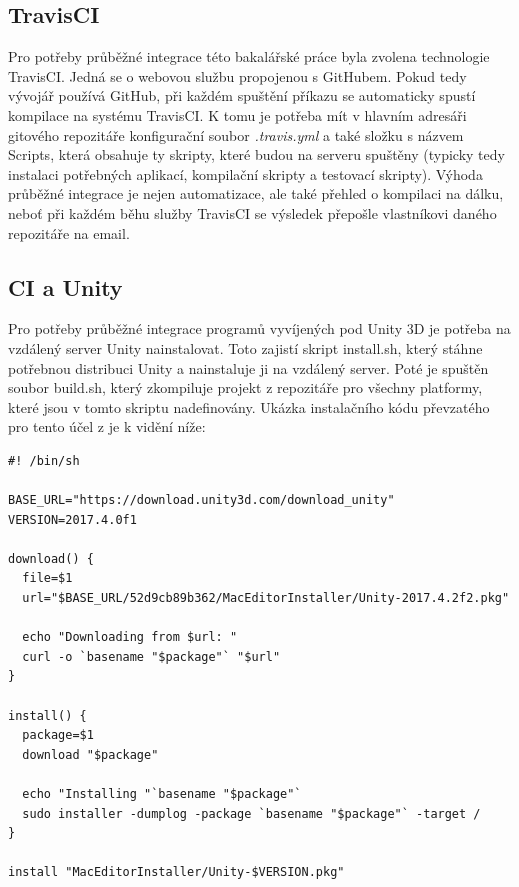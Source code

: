\documentclass[thesis=B,czech]{FITthesis}[2012/06/26]
\begin{document}
	\subsection{TravisCI}
Pro potřeby průběžné integrace této bakalářské práce byla zvolena technologie TravisCI. Jedná se o webovou službu propojenou s GitHubem. Pokud tedy vývojář používá GitHub, při každém spuštění příkazu  se automaticky spustí kompilace na systému TravisCI. K tomu je potřeba mít v hlavním adresáři gitového repozitáře konfigurační soubor \emph{.travis.yml} a také složku s názvem Scripts, která obsahuje ty skripty, které budou na serveru spuštěny (typicky tedy instalaci potřebných aplikací, kompilační skripty a testovací skripty). Výhoda průběžné integrace je nejen automatizace, ale také přehled o kompilaci na dálku, neboť při každém běhu služby TravisCI se výsledek přepošle vlastníkovi daného repozitáře na email.

\subsection{CI a Unity}
Pro potřeby průběžné integrace programů vyvíjených pod Unity 3D je potřeba na vzdálený server Unity nainstalovat. Toto zajistí skript install.sh, který stáhne potřebnou distribuci Unity a nainstaluje ji na vzdálený server. Poté je spuštěn soubor build.sh, který zkompiluje projekt z repozitáře pro všechny platformy, které jsou v tomto skriptu nadefinovány. Ukázka instalačního kódu převzatého pro tento účel z \cite{travis} je k vidění níže:

\begin{minipage}[c]{0.95\textwidth}
\begin{lstlisting}[frame=single]
#! /bin/sh

BASE_URL="https://download.unity3d.com/download_unity"
VERSION=2017.4.0f1

download() {
  file=$1
  url="$BASE_URL/52d9cb89b362/MacEditorInstaller/Unity-2017.4.2f2.pkg"

  echo "Downloading from $url: "
  curl -o `basename "$package"` "$url"
}

install() {
  package=$1
  download "$package"

  echo "Installing "`basename "$package"`
  sudo installer -dumplog -package `basename "$package"` -target /
}

install "MacEditorInstaller/Unity-$VERSION.pkg"
\end{lstlisting}
\end{minipage}
\end{document}
